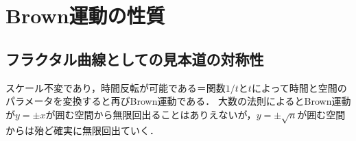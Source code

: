 \documentclass[uplatex,dvipdfmx]{jsreport}
\begin{document}
\section{Brown運動の性質}

\subsection{フラクタル曲線としての見本道の対称性}

\begin{tcolorbox}[colframe=ForestGreen, colback=ForestGreen!10!white,breakable,colbacktitle=ForestGreen!40!white,coltitle=black,fonttitle=\bfseries\sffamily,
title=]
    スケール不変であり，時間反転が可能である＝関数$1/t$と$t$によって時間と空間のパラメータを変換すると再びBrown運動である．
    大数の法則によるとBrown運動が$y=\pm x$が囲む空間から無限回出ることはありえないが，$y=\pm\sqrt{n}$が囲む空間からは殆ど確実に無限回出ていく．
\end{tcolorbox}
\end{document}
